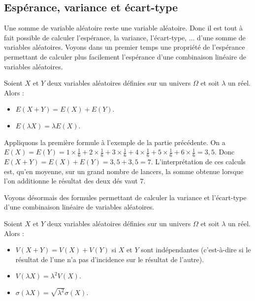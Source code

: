 	\subsection{Espérance, variance et écart-type}

	Une somme de variable aléatoire reste une variable aléatoire. Donc il est tout à fait possible de calculer l'espérance, la variance, l'écart-type, ... d'une somme de variables aléatoires.
	\newpar
	Voyons dans un premier temps une propriété de l'espérance permettant de calculer plus facilement l'espérance d'une combinaison linéaire de variables aléatoires.

	\begin{formula}
		Soient $X$ et $Y$ deux variables aléatoires définies sur un univers $\Omega$ et soit $\lambda$ un réel. Alors :
		\begin{itemize}
			\item $E(X + Y) = E(X) + E(Y)$.
			\item $E(\lambda X) = \lambda E(X)$.
		\end{itemize}
	\end{formula}

	\begin{tip}[Applications]
		Appliquons la première formule à l'exemple de la partie précédente.
		\newpar
		On a $E(X) = E(Y) = 1 \times \frac{1}{6} + 2 \times \frac{1}{6} + 3 \times \frac{1}{6} + 4 \times \frac{1}{6} + 5 \times \frac{1}{6} + 6 \times \frac{1}{6} = 3,5$.
		\newpar
		Donc $E(X+Y) = E(X) + E(Y) = 3,5 + 3,5 = 7$.
		\newpar
		L'interprétation de ces calculs est, qu'en moyenne, sur un grand nombre de lancers, la somme obtenue lorsque l'on additionne le résultat des deux dés vaut $7$.
	\end{tip}

	Voyons désormais des formules permettant de calculer la variance et l'écart-type d'une combinaison linéaire de variables aléatoires.

	\begin{formula}
		Soient $X$ et $Y$ deux variables aléatoires définies sur un univers $\Omega$ et soit $\lambda$ un réel. Alors :
		\begin{itemize}
			\item $V(X + Y) = V(X) + V(Y)$ si $X$ et $Y$ sont indépendantes (c'est-à-dire si le résultat de l'une n'a pas d'incidence sur le résultat de l'autre).
			\item $V(\lambda X) = \lambda^2 V(X)$.
			\item $\sigma(\lambda X) = \sqrt{\lambda^2} \sigma(X)$.
		\end{itemize}
	\end{formula}


